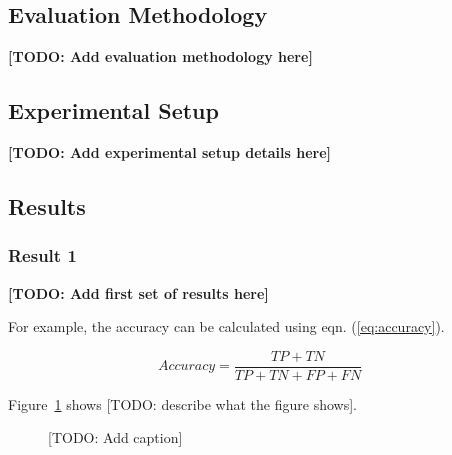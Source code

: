 
\subsection{Evaluation Methodology}


\textbf{[TODO: Add evaluation methodology here]}

\subsection{Experimental Setup}


\textbf{[TODO: Add experimental setup details here]}

\subsection{Results}


\subsubsection{Result 1}

\textbf{[TODO: Add first set of results here]}

For example, the accuracy can be calculated using eqn. (\ref{eq:accuracy}).

\begin{equation}
  \label{eq:accuracy}
  Accuracy = \frac{TP + TN}{TP + TN + FP + FN}
\end{equation}

Figure~\ref{fig:result1} shows [TODO: describe what the figure shows].

\begin{figure}[H]
  \centering
  \caption{[TODO: Add caption]}
  \label{fig:result1}
\end{figure}


